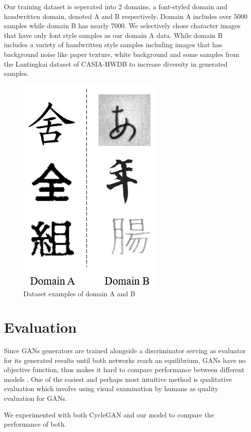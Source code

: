 \documentclass[12pt]{report}
\begin{document}
Our training dataset is seperated into 2 domains, a font-styled domain and handwritten domain, denoted A and B respectively. Domain A includes over 5000 samples while domain B has nearly 7000. We selectively chose character images that have only font style samples as our domain A data. While domain B includes a variety of handwritten style samples including images that has background noise like paper texture, white background and some samples from the Lantingkai dataset of CASIA-HWDB\cite{casia} to increase diversity in generated samples.

\begin{figure}[h]
	\centering
	\includegraphics[scale=0.9]{data-examples}
	\caption{Dataset examples of domain A and B}
	\label{fig:data-examples}
\end{figure}


\section{Evaluation}
Since GANs generators are trained alongside a discriminator serving as evaluator for its generated results until both networks reach an equilibrium, GANs have no objective function, thus makes it hard to compare performance between different models \cite{training-gans}. One of the easiest and perhaps most intuitive method is qualitative evaluation which involve using visual examination by humans as quality evaluation for GANs.

We experimented with both CycleGAN and our model to compare the performance of both. 
\end{document}
